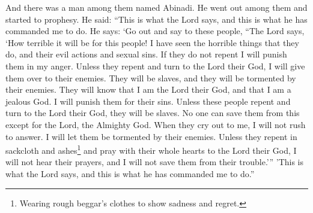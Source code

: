 And there was a man among them named Abinadi. He went out among them and started to prophesy. He said: ``This is what the Lord says, and this is what he has commanded me to do. He says: \lq Go out and say to these people, ``The Lord says, \lq How terrible it will be for this people! I have seen the horrible things that they do, and their evil actions and sexual sins. If they do not repent I will punish them in my anger.
\bverse \iffalse And except they repent and turn to the Lord their God, behold, I will deliver them into the hands of their enemies; yea, and they shall be brought into bondage; and they shall be afflicted by the hand of their enemies. \fi
Unless they repent and turn to the Lord their God, I will give them over to their enemies. They will be slaves, and they will be tormented by their enemies.
\bverse \iffalse And it shall come to pass that they shall know that I am the Lord their God, and am a jealous God, visiting the iniquities of my people. \fi
They will know that I am the Lord their God, and that I am a jealous God. I will punish them for their sins.
\bverse \iffalse And it shall come to pass that except this people repent and turn unto the Lord their God, they shall be brought into bondage; and none shall deliver them, except it be the Lord the Almighty God. \fi
Unless these people repent and turn to the Lord their God, they will be slaves. No one can save them from this except for the Lord, the Almighty God.
\bverse \iffalse Yea, and it shall come to pass that when they shall cry unto me I will be slow to hear their cries; yea, and I will suffer them that they be smitten by their enemies. \fi
When they cry out to me, I will not rush to answer. I will let them be tormented by their enemies.
\bverse \iffalse And except they repent in sackcloth and ashes, and cry mightily to the Lord their God, I will not hear their prayers, neither will I deliver them out of their afflictions; and thus saith the Lord, and thus hath he commanded me. \fi
Unless they repent in sackcloth and ashes\footnote{Wearing rough beggar's clothes to show sadness and regret.} and pray with their whole hearts to the Lord their God, I will not hear their prayers, and I will not save them from their trouble.\rq '' \rq This is what the Lord says, and this is what he has commanded me to do.''
\bverse \iffalse Now it came to pass that when Abinadi had spoken these words unto them they were wroth with him, and sought to take away his life; but the Lord delivered him out of their hands. \fi
